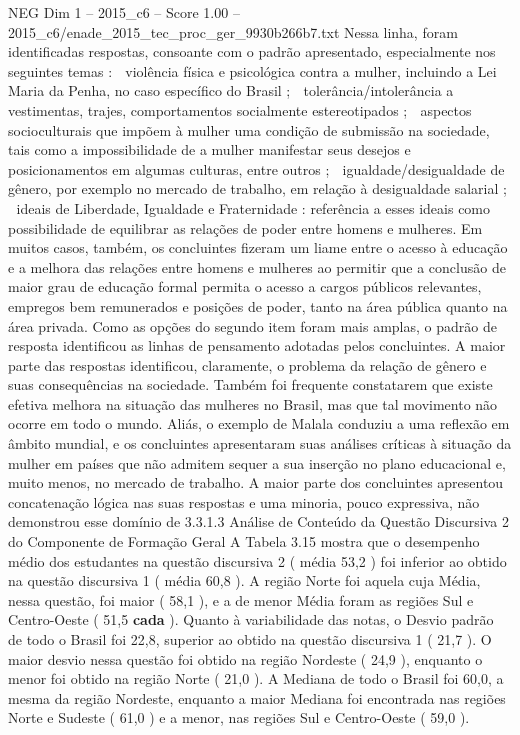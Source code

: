 \begin{textsample}{NEG Dim 1 – 2015\_c6 – Score 1.00 – 2015\_c6/enade\_2015\_tec\_proc\_ger\_9930b266b7.txt}
Nessa linha, foram identificadas respostas, consoante com o padrão apresentado, especialmente nos seguintes temas :  violência física e psicológica contra a mulher, incluindo a Lei Maria da Penha, no caso específico do Brasil ;  tolerância/intolerância a vestimentas, trajes, comportamentos socialmente estereotipados ;  aspectos socioculturais que impõem à mulher uma condição de submissão na sociedade, tais como a impossibilidade de a mulher manifestar seus desejos e posicionamentos em algumas culturas, entre outros ;  igualdade/desigualdade de gênero, por exemplo no mercado de trabalho, em relação à desigualdade salarial ;  ideais de Liberdade, Igualdade e Fraternidade : referência a esses ideais como possibilidade de equilibrar as relações de poder entre homens e mulheres.
Em muitos casos, também, os concluintes fizeram um liame entre o acesso à educação e a melhora das relações entre homens e mulheres ao permitir que a conclusão de maior grau de educação formal permita o acesso a cargos públicos relevantes, empregos bem remunerados e posições de poder, tanto na área pública quanto na área privada.
Como as opções do segundo item foram mais amplas, o padrão de resposta identificou as linhas de pensamento adotadas pelos concluintes.
A maior parte das respostas identificou, claramente, o problema da relação de gênero e suas consequências na sociedade.
Também foi frequente constatarem que existe efetiva melhora na situação das mulheres no Brasil, mas que tal movimento não ocorre em todo o mundo.
Aliás, o exemplo de Malala conduziu a uma reflexão em âmbito mundial, e os concluintes apresentaram suas análises críticas à situação da mulher em países que não admitem sequer a sua inserção no plano educacional e, muito menos, no mercado de trabalho.
A maior parte dos concluintes apresentou concatenação lógica nas suas respostas e uma minoria, pouco expressiva, não demonstrou esse domínio de 3.3.1.3 Análise de Conteúdo da Questão Discursiva 2 do Componente de Formação Geral A Tabela 3.15 mostra que o desempenho médio dos estudantes na questão discursiva 2 ( média 53,2 ) foi inferior ao obtido na questão discursiva 1 ( média 60,8 ).
A região Norte foi aquela cuja Média, nessa questão, foi maior ( 58,1 ), e a de menor Média foram as regiões Sul e Centro-Oeste ( 51,5 \textbf{cada} ).
Quanto à variabilidade das notas, o Desvio padrão de todo o Brasil foi 22,8, superior ao obtido na questão discursiva 1 ( 21,7 ).
O maior desvio nessa questão foi obtido na região Nordeste ( 24,9 ), enquanto o menor foi obtido na região Norte ( 21,0 ).
A Mediana de todo o Brasil foi 60,0, a mesma da região Nordeste, enquanto a maior Mediana foi encontrada nas regiões Norte e Sudeste ( 61,0 ) e a menor, nas regiões Sul e Centro-Oeste ( 59,0 ).

\end{textsample}
